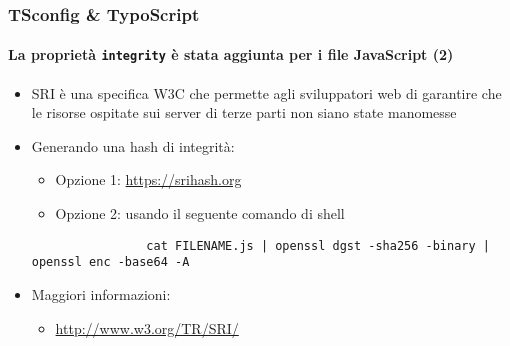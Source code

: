 \begin{frame}[fragile]
	\frametitle{TSconfig \& TypoScript}
	\framesubtitle{La proprietà \texttt{integrity} è stata aggiunta per i file JavaScript (2)}


	\begin{itemize}

		\item SRI è una specifica W3C che permette agli sviluppatori web di garantire che
			le risorse ospitate sui server di terze parti non siano state manomesse 
			

		\item Generando una hash di integrità:

			\begin{itemize}
				\item Opzione 1: \url{https://srihash.org}
				\item Opzione 2: usando il seguente comando di shell
			\end{itemize}

			\begin{lstlisting}
				cat FILENAME.js | openssl dgst -sha256 -binary | openssl enc -base64 -A
			\end{lstlisting}

		\item Maggiori informazioni:

			\begin{itemize}
				\item \url{http://www.w3.org/TR/SRI/}
			\end{itemize}

	\end{itemize}

\end{frame}

